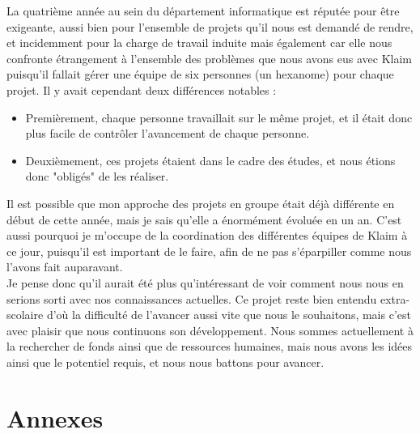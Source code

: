 \documentclass{article}
\begin{document}
		La quatrième année au sein du département informatique est réputée pour être exigeante, aussi bien  pour l'ensemble de projets qu'il nous est demandé de rendre, et incidemment pour la charge de travail induite mais également car elle nous confronte étrangement à l'ensemble des problèmes que nous avons eus avec Klaim puisqu'il fallait gérer une équipe de six personnes (un hexanome) pour chaque projet. Il y avait cependant deux différences notables :
			\begin{itemize}
				\item Premièrement, chaque personne travaillait sur le même projet, et il était donc plus facile de contrôler l'avancement de chaque personne. 
				\item Deuxièmement, ces projets étaient dans le cadre des études, et nous étions donc "obligés" de les réaliser.\\
			\end{itemize}
		
		Il est possible que mon approche des projets en groupe était déjà différente en début de cette année, mais je sais qu'elle a énormément évoluée en un an. C'est aussi pourquoi je m'occupe de la coordination des différentes équipes de Klaim à ce jour, puisqu'il est important de le faire, afin de ne pas s'éparpiller comme nous l'avons fait auparavant.\\
		
		Je pense donc qu'il aurait été plus qu'intéressant de voir comment nous nous en serions sorti avec nos connaissances actuelles. Ce projet reste bien entendu extra-scolaire d'où la difficulté de l'avancer aussi vite que nous le souhaitons, mais c'est avec plaisir que nous continuons son développement. Nous sommes actuellement à la rechercher de fonds ainsi que de ressources humaines, mais nous avons les idées ainsi que le potentiel requis, et nous nous battons pour avancer.
	
\newpage	
\section{Annexes}
\end{document}
